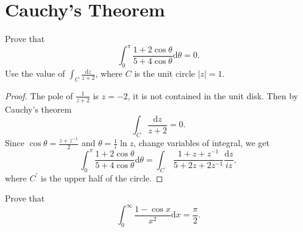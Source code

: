 
\section{Cauchy's Theorem}

\begin{exercise}{}{}
  Prove that
  \begin{equation}
    \int_0^{\pi} \frac{1 + 2 \cos \theta}{5 + 4 \cos \theta} \mathrm{d} \theta = 0.
  \end{equation}
  Use the value of $\int_C \frac{\mathrm{d} z}{z + 2}$, where $C$ is the unit circle $|z| = 1$.
\end{exercise}

\begin{proof}
  The pole of $\frac{1}{z+2}$ is $z = -2$, it is not contained in the unit disk.
  Then by Cauchy's theorem
  \begin{equation}
    \int_C \frac{\mathrm{d} z}{z + 2} = 0.
  \end{equation}
  Since $\cos \theta = \frac{z + z^{-1}}{2}$ and $\theta = \frac{1}{i}\ln z$,
  change variables of integral, we get
  \begin{equation}
    \int_0^{\pi} \frac{1 + 2 \cos \theta}{5 + 4 \cos \theta}\mathrm{d} \theta
    = \int_{C^{\prime}} \frac{1 + z + z^{-1}}{5 + 2z + 2z^{-1}} \frac{\mathrm{d} z}{i z},
  \end{equation}
  where $C^{\prime}$ is the upper half of the circle.
\end{proof}

\begin{exercise}{}{}
  Prove that 
  \begin{equation}
    \int_0^{\infty} \frac{1 - \cos x}{x^2}\mathrm{d} x = \frac{\pi}{2}.
  \end{equation}
\end{exercise}











